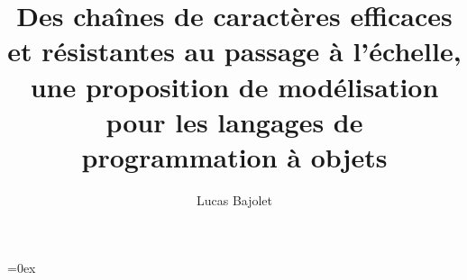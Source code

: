 \documentclass[11pt,twoside]{memoireuqam1.3}
\newcommand\blankpage{%
	\null
	\thispagestyle{empty}%
	\addtocounter{page}{-1}%
\newpage}
\begin{document}

\title{Des cha\^ines de caract\`eres efficaces et r\'esistantes au passage \`a l'\'echelle, une proposition de mod\'elisation pour les langages de programmation \`a objets}
\author{Lucas Bajolet}
\uqammemoire


\thispagestyle{empty}        %
\maketitle


\renewcommand \listfigurename{LISTE DES FIGURES}
\renewcommand \appendixname{APPENDICE}
\renewcommand \figurename{Figure}
\renewcommand \tablename{Tableau}

\addtocounter{page}{1} %
\cleardoublepage
\thispagestyle{empty} %

\tableofcontents %
\listoffigures %
\listoftables %




\parindent=0ex %

\afterpage{\blankpage}









\end{document}
